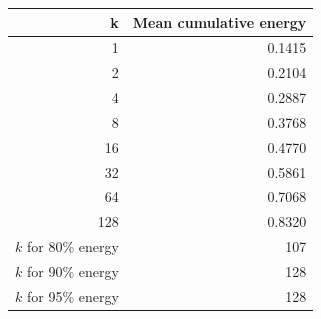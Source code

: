 \begin{tabular}{rr}
\toprule
k & Mean cumulative energy \\
\midrule
1 & 0.1415 \\
2 & 0.2104 \\
4 & 0.2887 \\
8 & 0.3768 \\
16 & 0.4770 \\
32 & 0.5861 \\
64 & 0.7068 \\
128 & 0.8320 \\
\midrule
$k$ for 80\% energy & 107 \\
$k$ for 90\% energy & 128 \\
$k$ for 95\% energy & 128 \\
\bottomrule
\end{tabular}
